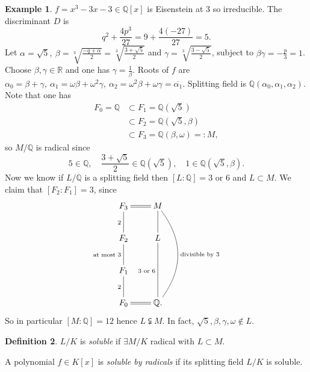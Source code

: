 \documentclass[a4paper]{article}
\newcommand{\Q}{\mathbb Q}
\newcommand{\R}{\mathbb R}
\theoremstyle{definition}
\newtheorem{defn}{Definition}[subsection]
\newtheorem{example}[defn]{Example}
\begin{document}
\begin{example}
$f=x^3-3x-3\in\Q[x]$ is Eisenstein at 3 so irreducible. The discriminant $D$ is
\[
q^2+\frac{4p^3}{27}=9+\frac{4(-27)}{27}=5.
\]
Let $\alpha=\sqrt5,\ \beta=\sqrt[3]{\frac{-q+\alpha}{2}}=\sqrt[3]{\frac{3+\sqrt5}{2}}$ and $\gamma=\sqrt[3]{\frac{3-\sqrt5}{2}}$, subject to $\beta\gamma=-\frac{p}3=1$. Choose $\beta,\gamma\in\R$ and one has $\gamma=\frac{1}{\beta}$. Roots of $f$ are $\alpha_0=\beta+\gamma,\ \alpha_1=\omega\beta+\omega^2\gamma,\ \alpha_2=\omega^2\beta+\omega\gamma=\overline{\alpha_1}$. Splitting field is $\Q(\alpha_0,\alpha_1,\alpha_2)$. Note that one has
\[
\begin{aligned}
F_0=\Q&\subset F_1=\Q(\sqrt5)\\
&\subset F_2=\Q(\sqrt5,\beta)\\
&\subset F_3=\Q(\beta,\omega)=:M,
\end{aligned}
\]
so $M/\Q$ is radical since
\[
5\in\Q,\quad \frac{3+\sqrt5}{2}\in\Q(\sqrt5),\quad 1\in \Q(\sqrt5,\beta).
\]
Now we know if $L/\Q$ is a splitting field then $[L:\Q]=3$ or 6 and $L\subset M$. We claim that $[F_2:F_1]=3$, since
\[
\xymatrix{
F_3\ar@{=}[r]\ar@{-}[d]_2 & M\ar@{-}[d]\ar@/^2pc/@{-}[ddd]^{\text{divisible by }3} \\
F_2\ar@{-}[d]_{\text{at most }3} & L\ar@{-}[dd]_{3\text{ or }6} \\
F_1\ar@{-}[d]_2 \\
F_0\ar@{=}[r] & \Q.
}
\]
So in particular $[M:\Q]=12$ hence $L\subsetneqq M$. In fact, $\sqrt5,\beta,\gamma,\omega\notin L$.
\end{example}

\begin{defn}
$L/K$ is \textit{soluble} if $\exists M/K$ radical with $L\subset M$.

A polynomial $f\in K[x]$ is \textit{soluble by radicals} if its splitting field $L/K$ is soluble.
\end{defn}
\end{document}
